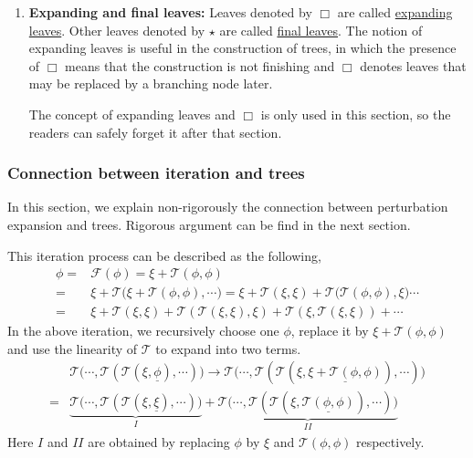 \begin{defn}
\begin{enumerate}
    
    \item \textbf{Expanding and final leaves:} Leaves denoted by $\Box$ are called \underline{expanding leaves}. Other leaves denoted by $\star$ are called \underline{final leaves}. The notion of expanding leaves is useful in the construction of trees, in which the presence of $\Box$ means that the construction is not finishing and $\Box$ denotes leaves that may be replaced by a branching node later.
    
    The concept of expanding leaves and $\Box$ is only used in this section, so the readers can safely forget it after that section.
\end{enumerate}

    


\end{defn}





\subsubsection{Connection between iteration and trees}\label{sec.connection} In this section, we explain non-rigorously the connection between perturbation expansion and trees. Rigorous argument can be find in the next section. 

This iteration process can be described as the following, 
\begin{equation*}
\begin{split}
    \phi=&\mathcal{F}(\phi)=\xi+\mathcal{T}(\phi,\phi)
    \\
    =&\xi+\mathcal{T}\Big(\xi+\mathcal{T}(\phi,\phi),
    \cdots\Big)=\xi+\mathcal{T}(\xi,\xi)+\mathcal{T}\Big(\mathcal{T}(\phi,\phi),
    \xi\Big)\cdots
    \\
    =&\xi+\mathcal{T}(\xi,\xi)+\mathcal{T}(\mathcal{T}(\xi,\xi),\xi)
    +\mathcal{T}(\xi,\mathcal{T}(\xi,\xi))+\cdots
\end{split}    
\end{equation*}
In the above iteration, we recursively choose one $\phi$, replace it by $\xi+\mathcal{T}(\phi,\phi)$ and use the linearity of $\mathcal{T}$ to expand into two terms.
\begin{equation}\label{eq.termgeneration}
\begin{split}
    &\mathcal{T}\Big(\cdots,\mathcal{T}(\mathcal{T}(\xi,\underline{\phi}),\cdots)\Big)\rightarrow \mathcal{T}\Big(\cdots,\mathcal{T}(\mathcal{T}(\xi,\underline{\xi+\mathcal{T}(\phi,\phi)}),\cdots)\Big)
    \\
    =& \underbrace{\mathcal{T}\Big(\cdots,\mathcal{T}(\mathcal{T}(\xi,\underline{\xi}),\cdots)\Big)}_{I}
    +\underbrace{\mathcal{T}\Big(\cdots,\mathcal{T}(\mathcal{T}(\xi,\underline{\mathcal{T}(\phi,\phi)}),\cdots)\Big)}_{II}
\end{split}        
\end{equation}
Here $I$ and $II$ are obtained by replacing $\phi$ by $\xi$ and $\mathcal{T}(\phi,\phi)$ respectively.


